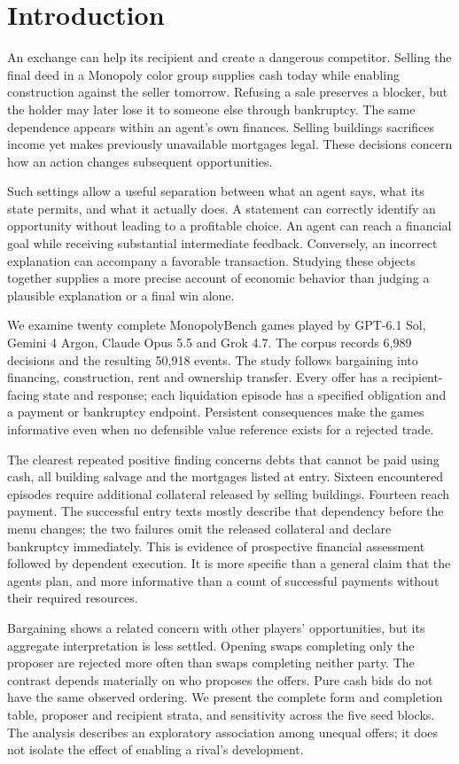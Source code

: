\section{Introduction}
An exchange can help its recipient and create a dangerous competitor. Selling the final deed in a Monopoly color group supplies cash today while enabling construction against the seller tomorrow. Refusing a sale preserves a blocker, but the holder may later lose it to someone else through bankruptcy. The same dependence appears within an agent's own finances. Selling buildings sacrifices income yet makes previously unavailable mortgages legal. These decisions concern how an action changes subsequent opportunities.

Such settings allow a useful separation between what an agent says, what its state permits, and what it actually does. A statement can correctly identify an opportunity without leading to a profitable choice. An agent can reach a financial goal while receiving substantial intermediate feedback. Conversely, an incorrect explanation can accompany a favorable transaction. Studying these objects together supplies a more precise account of economic behavior than judging a plausible explanation or a final win alone.

We examine twenty complete MonopolyBench games played by GPT-6.1 Sol, Gemini 4 Argon, Claude Opus 5.5 and Grok 4.7. The corpus records 6,989 decisions and the resulting 50,918 events. The study follows bargaining into financing, construction, rent and ownership transfer. Every offer has a recipient-facing state and response; each liquidation episode has a specified obligation and a payment or bankruptcy endpoint. Persistent consequences make the games informative even when no defensible value reference exists for a rejected trade.

The clearest repeated positive finding concerns debts that cannot be paid using cash, all building salvage and the mortgages listed at entry. Sixteen encountered episodes require additional collateral released by selling buildings. Fourteen reach payment. The successful entry texts mostly describe that dependency before the menu changes; the two failures omit the released collateral and declare bankruptcy immediately. This is evidence of prospective financial assessment followed by dependent execution. It is more specific than a general claim that the agents plan, and more informative than a count of successful payments without their required resources.

Bargaining shows a related concern with other players' opportunities, but its aggregate interpretation is less settled. Opening swaps completing only the proposer are rejected more often than swaps completing neither party. The contrast depends materially on who proposes the offers. Pure cash bids do not have the same observed ordering. We present the complete form and completion table, proposer and recipient strata, and sensitivity across the five seed blocks. The analysis describes an exploratory association among unequal offers; it does not isolate the effect of enabling a rival's development.


